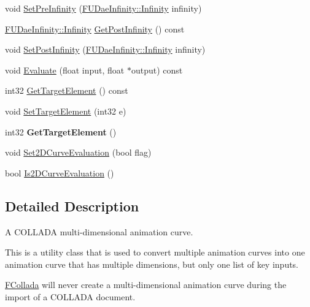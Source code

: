 \begin{DoxyCompactItemize}
\item 
void \hyperlink{classFCDAnimationMultiCurve_a22a66864b972abde1cacb06ba6d7653a}{SetPreInfinity} (\hyperlink{namespaceFUDaeInfinity_a9d8fb86affe94d1586d728d4c2e89008}{FUDaeInfinity::Infinity} infinity)
\item 
\hyperlink{namespaceFUDaeInfinity_a9d8fb86affe94d1586d728d4c2e89008}{FUDaeInfinity::Infinity} \hyperlink{classFCDAnimationMultiCurve_a2700e160254c7bccb321cf19234e1228}{GetPostInfinity} () const 
\item 
void \hyperlink{classFCDAnimationMultiCurve_a498e31528b918826b0ad7069622607b2}{SetPostInfinity} (\hyperlink{namespaceFUDaeInfinity_a9d8fb86affe94d1586d728d4c2e89008}{FUDaeInfinity::Infinity} infinity)
\item 
void \hyperlink{classFCDAnimationMultiCurve_a50979bee5862ccb12a5c829e9410a4eb}{Evaluate} (float input, float $\ast$output) const 
\item 
int32 \hyperlink{classFCDAnimationMultiCurve_ae1cd6afb67f21bc40e706ec73bc911e5}{GetTargetElement} () const 
\item 
void \hyperlink{classFCDAnimationMultiCurve_ae9a30b28b6ab7f201717fd6a3d4db770}{SetTargetElement} (int32 e)
\item 
\hypertarget{classFCDAnimationMultiCurve_ad5383e34ae38c53c4122871ae717cb8a}{
int32 {\bfseries GetTargetElement} ()}
\label{classFCDAnimationMultiCurve_ad5383e34ae38c53c4122871ae717cb8a}

\item 
void \hyperlink{classFCDAnimationMultiCurve_aad5e1829346170165119d01d92de62bb}{Set2DCurveEvaluation} (bool flag)
\item 
bool \hyperlink{classFCDAnimationMultiCurve_ace2392f79497988d3f9742504e9032ee}{Is2DCurveEvaluation} ()
\end{DoxyCompactItemize}


\subsection{Detailed Description}
A COLLADA multi-\/dimensional animation curve.

This is a utility class that is used to convert multiple animation curves into one animation curve that has multiple dimensions, but only one list of key inputs.

\hyperlink{namespaceFCollada}{FCollada} will never create a multi-\/dimensional animation curve during the import of a COLLADA document. 

